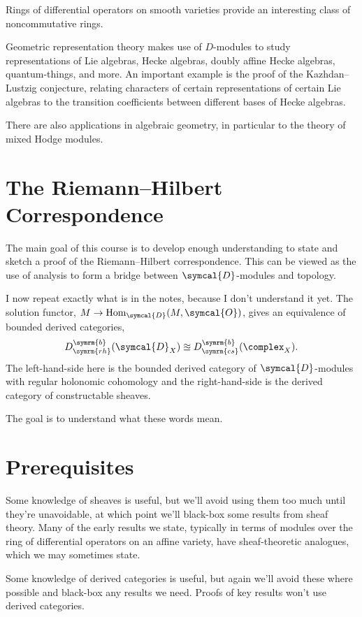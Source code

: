 \documentclass[fleqn]{NotesClass}
\newcommand{\equivalent}{\approxeq}
\newcommand{\D}{\symcal{D}}
\newcommand{\sheaf}[1]{\symcal{#1}}
\DeclareMathOperator{\Hom}{Hom}
\newcommand{\bounded}{\symrm{b}}
\newcommand{\reghol}{\symrm{rh}}
\newcommand{\constructable}{\symrm{cs}}
\begin{document}
    Rings of differential operators on smooth varieties provide an interesting class of noncommutative rings.
    
    Geometric representation theory makes use of \(D\)-modules to study representations of Lie algebras, Hecke algebras, doubly affine Hecke algebras, quantum-things, and more.
    An important example is the proof of the Kazhdan--Lustzig conjecture, relating characters of certain representations of certain Lie algebras to the transition coefficients between different bases of Hecke algebras.
    
    There are also applications in algebraic geometry, in particular to the theory of mixed Hodge modules.
    
    \section{The Riemann--Hilbert Correspondence}
    The main goal of this course is to develop enough understanding to state and sketch a proof of the Riemann--Hilbert correspondence.
    This can be viewed as the use of analysis to form a bridge between \(\D\)-modules and topology.
    
    I now repeat exactly what is in the notes, because I don't understand it yet.
    The solution functor, \(M \to \Hom_{\D}(M, \sheaf{O})\), gives an equivalence of bounded derived categories,
    \begin{equation}
        D^{\bounded}_{\reghol}(\D_X) \equivalent D^{\bounded}_{\constructable}(\complex_X).
    \end{equation}
    The left-hand-side here is the bounded derived category of \(\D\)-modules with regular holonomic cohomology and the right-hand-side is the derived category of constructable sheaves.
    
    The goal is to understand what these words mean.
    
    \section{Prerequisites}
    Some knowledge of sheaves is useful, but we'll avoid using them too much until they're unavoidable, at which point we'll black-box some results from sheaf theory.
    Many of the early results we state, typically in terms of modules over the ring of differential operators on an affine variety, have sheaf-theoretic analogues, which we may sometimes state.
    
    Some knowledge of derived categories is useful, but again we'll avoid these where possible and black-box any results we need.
    Proofs of key results won't use derived categories.
    
\end{document}
